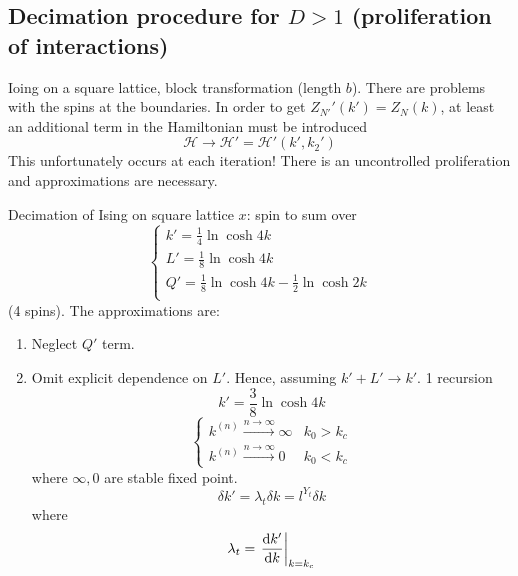 \documentclass[../main/main.tex]{subfiles}
\begin{document}
\subsection{Decimation procedure for \( D>1 \) (proliferation of interactions)}
Ioing on a square lattice, block transformation (length \( b \)). There are problems with the spins at the boundaries.
In order to get \( Z_{N'}' (k') = Z_N (k) \), at least an additional term in the Hamiltonian must be introduced
\begin{equation}
  \mathcal{H} \rightarrow \mathcal{H}' = \mathcal{H}' (k',k_2')
\end{equation}
This unfortunately occurs at each iteration! There is an uncontrolled proliferation and approximations are necessary.
\begin{example}{Decimation of Ising on square lattice}{}
  \( x \): spin to sum over
\begin{equation}
  \begin{cases}
   k' = \frac{1}{4} \ln{\cosh 4 k} \\
   L' = \frac{1}{8} \ln{\cosh 4 k} \\
   Q' = \frac{1}{8} \ln{\cosh 4 k} - \frac{1}{2} \ln{\cosh 2 k}\\
  \end{cases}
\end{equation}
(4 spins). The approximations are:
\begin{enumerate}
\item Neglect \( Q' \) term.
\item Omit explicit dependence on \( L' \). Hence, assuming \( k'+L' \rightarrow k' \). 1 recursion
\begin{equation}
  k' = \frac{3}{8} \ln{\cosh 4 k}
\end{equation}
\begin{equation}
  \begin{cases}
   k^{(n)} \overset{n \rightarrow \infty }{\longrightarrow} \infty  & k_0 > k_c \\
   k^{(n)} \overset{n \rightarrow \infty }{\longrightarrow} 0  & k_0 < k_c
  \end{cases}
\end{equation}
where \( \infty ,0 \) are stable fixed point.
\begin{equation}
  \delta k' = \lambda _t \delta k = l^{Y _t} \delta k
\end{equation}
where
\begin{equation}
  \lambda _t = \eval{\dv{k'}{k} }_{k=k_c}
\end{equation}

\end{enumerate}
\end{example}
\end{document}
